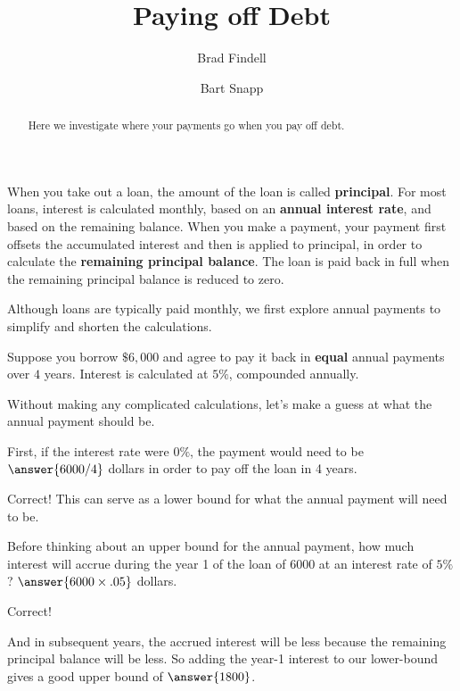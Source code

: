 \documentclass[handout,space,nooutcomes]{ximera}
\title{Paying off Debt}
\author{Brad Findell \and Bart Snapp}
\begin{document}
\begin{abstract}
Here we investigate where your payments go when you pay off debt.
\end{abstract}
\maketitle

When you take out a loan, the amount of the loan is called
\textbf{principal}.  For most loans, interest is calculated monthly,
based on an \textbf{annual interest rate}, and based on the remaining
balance.  When you make a payment, your payment first offsets the
accumulated interest and then is applied to principal, in order to
calculate the \textbf{remaining principal balance}.  The loan is paid
back in full when the remaining principal balance is reduced to zero.


Although loans are typically paid monthly, we first explore annual payments to simplify and shorten the calculations.  

\begin{question}[2.5in]
Suppose you borrow $\$6,000$ and agree to pay it back in \textbf{equal} annual
payments over $4$ years.  Interest is calculated at $5\%$,
compounded annually. 

Without making any complicated calculations, let's make a guess at what the annual payment should be.  

First, if the interest rate were $0\%$, the payment would need to be $\answer{6000/4}$ dollars in order to pay off the loan in 4 years.  

\begin{question}
Correct!  This can serve as a lower bound for what the annual payment will need to be.  

Before thinking about an upper bound for the annual payment, how much interest will accrue during the year 1 of the loan of $6000$ 
at an interest rate of $5\%$?  
$\answer{6000\times.05}$ dollars.  

\begin{question}
Correct!  

And in subsequent years, the accrued interest will be less because the remaining principal balance will be less.  
So adding the year-1 interest to our lower-bound gives a good upper bound of $\answer{1800}$.  
 
\end{question}
\end{question}
\end{question}
\end{document}

